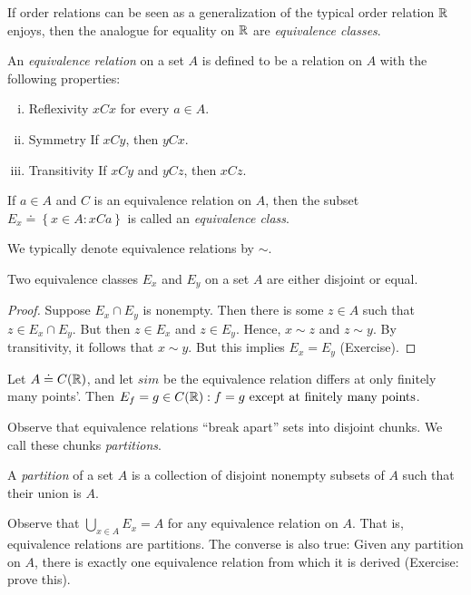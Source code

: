 If order relations can be seen as a generalization of the typical order relation
$\mathbb{R}$ enjoys, then the analogue for equality on $\mathbb{R}$ are \emph{equivalence
classes}.
\begin{definition}
	An \emph{equivalence relation} on a set $A$ is defined to be a relation on $A$
	with the following properties:
	\begin{enumerate}[(i)]
		\item{Reflexivity} $xCx$ for every $a \in A$.
		\item{Symmetry} If $xCy$, then $yCx$.
		\item{Transitivity} If $xCy$ and $yCz$, then $xCz$.
	\end{enumerate}
	If $a \in A$ and $C$ is an equivalence relation on $A$, then 
	the subset $E_{x} \doteq \left\{ x \in A: xCa  \right\}$ is called
	an \emph{equivalence class}.
\end{definition}
\begin{notation}
	We typically denote equivalence relations by $\sim$.
\end{notation}
\begin{lemma}\label{lem:}
	Two equivalence classes $E_{x}$ and $E_{y}$ on a set $A$ are 
	either disjoint or equal.
\end{lemma}
\begin{proof}
	Suppose $E_{x} \cap E_{y}$ is nonempty. Then there is some $z \in A$
	such that $z \in E_{x} \cap E_{y}$. But then $z \in E_{x}$ and
	$z \in E_{y}$. Hence, $x \sim z$ and $z \sim y$. By transitivity, it follows
	that $x \sim y$. But this implies $E_{x} = E_{y}$ (Exercise).		
\end{proof}
\begin{example}
	Let $A \doteq C(\mathbb{R})$, and let $sim$ be the equivalence relation differs at
	only finitely many points'. Then $E_{f} = {g \in C(\mathbb{R}): f=g \ \text{except at
	finitely many points}}$.
\end{example}
Observe that equivalence relations ``break apart'' sets into disjoint chunks. We call
these chunks \emph{partitions}.
\begin{definition}
	A \emph{partition} of a set $A$  is a collection of disjoint nonempty subsets of
	$A$ such that their union is $A$.
\end{definition}
Observe that $\bigcup_{x \in A}  E_{x}  = A$ for any equivalence relation on
$A$. That is, equivalence relations are partitions. The converse is also true:
Given any partition on $A$, there is exactly one equivalence relation from
which it is derived (Exercise: prove this).

